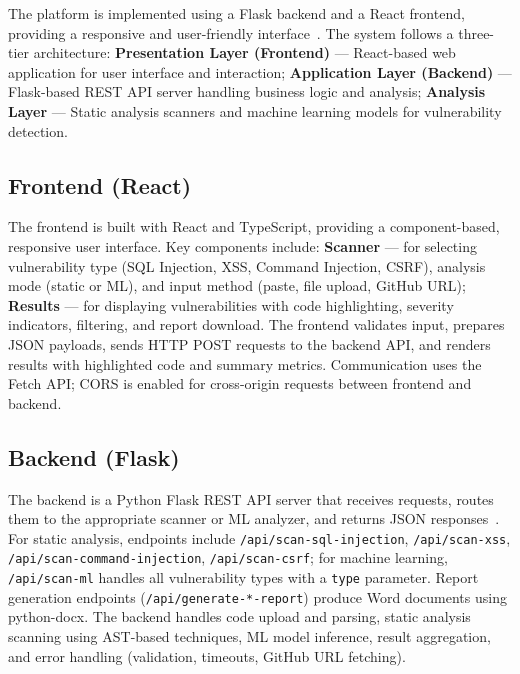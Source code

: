 The platform is implemented using a Flask backend and a React frontend, providing a responsive and user-friendly interface~\cite{React,Flask,AlmasiToolRepo,AlmasiDeployedApp}. The system follows a three-tier architecture: \textbf{Presentation Layer (Frontend)} --- React-based web application for user interface and interaction; \textbf{Application Layer (Backend)} --- Flask-based REST API server handling business logic and analysis; \textbf{Analysis Layer} --- Static analysis scanners and machine learning models for vulnerability detection.

\subsection{Frontend (React)}
\label{sec:frontend}

The frontend is built with React and TypeScript, providing a component-based, responsive user interface. Key components include: \textbf{Scanner} --- for selecting vulnerability type (SQL Injection, XSS, Command Injection, CSRF), analysis mode (static or ML), and input method (paste, file upload, GitHub URL); \textbf{Results} --- for displaying vulnerabilities with code highlighting, severity indicators, filtering, and report download. The frontend validates input, prepares JSON payloads, sends HTTP POST requests to the backend API, and renders results with highlighted code and summary metrics. Communication uses the Fetch API; CORS is enabled for cross-origin requests between frontend and backend.

\subsection{Backend (Flask)}
\label{sec:backend}

The backend is a Python Flask REST API server that receives requests, routes them to the appropriate scanner or ML analyzer, and returns JSON responses~\cite{Flask,AlmasiToolRepo}. For static analysis, endpoints include \texttt{/api/scan-sql-injection}, \texttt{/api/scan-xss}, \texttt{/api/scan-command-injection}, \texttt{/api/scan-csrf}; for machine learning, \texttt{/api/scan-ml} handles all vulnerability types with a \texttt{type} parameter. Report generation endpoints (\texttt{/api/generate-*-report}) produce Word documents using python-docx. The backend handles code upload and parsing, static analysis scanning using AST-based techniques, ML model inference, result aggregation, and error handling (validation, timeouts, GitHub URL fetching).

